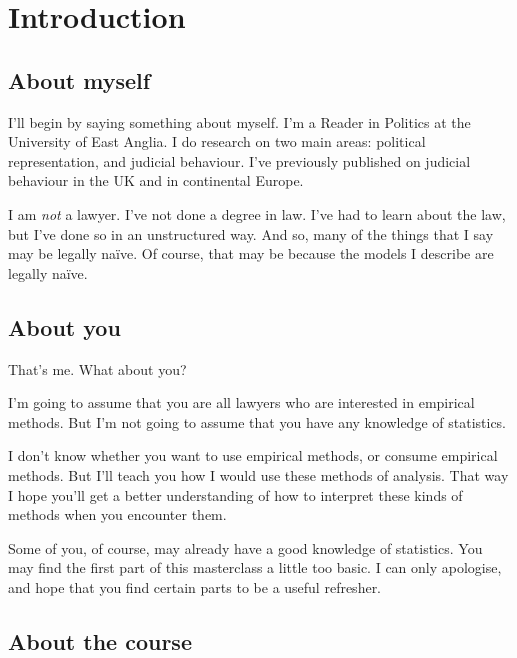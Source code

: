 \documentclass[12pt,twoside]{article}
\title{\myTitle}
\author{Chris Hanretty}
\date{May 2016}
\begin{document}
\maketitle

\section{Introduction}\label{introduction}

\subsection{About myself}\label{about-myself}

I'll begin by saying something about myself. I'm a Reader in Politics at
the University of East Anglia. I do research on two main areas:
political representation, and judicial behaviour. I've previously
published on judicial behaviour in the UK and in continental Europe.

I am \emph{not} a lawyer. I've not done a degree in law. I've had to
learn about the law, but I've done so in an unstructured way. And so,
many of the things that I say may be legally naïve. Of course, that may
be because the models I describe are legally naïve.

\subsection{About you}\label{about-you}

That's me. What about you?

I'm going to assume that you are all lawyers who are interested in
empirical methods. But I'm not going to assume that you have any
knowledge of statistics.

I don't know whether you want to use empirical methods, or consume
empirical methods. But I'll teach you how I would use these methods of
analysis. That way I hope you'll get a better understanding of how to
interpret these kinds of methods when you encounter them.

Some of you, of course, may already have a good knowledge of statistics.
You may find the first part of this masterclass a little too basic. I
can only apologise, and hope that you find certain parts to be a useful
refresher.

\subsection{About the course}\label{about-the-course}
\end{document}

